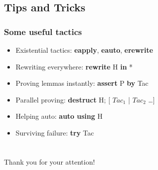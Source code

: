 \documentclass{beamer}
\begin{document}
\subsection{Tips and Tricks}

\begin{frame}
  \frametitle{Some useful tactics}
  \begin{itemize}
    \item Existential tactics: \textbf{eapply}, \textbf{eauto}, \textbf{erewrite}
    \item Rewriting everywhere: \textbf{rewrite} H \textbf{in} *
    \item Proving lemmas instantly: \textbf{assert} P \textbf{by} Tac
    \item Parallel proving: \textbf{destruct} H; [ $Tac_1$ | $Tac_2$ \ldots ]
    \item Helping auto: \textbf{auto using} H
    \item Surviving failure: \textbf{try} Tac
  \end{itemize}
\end{frame}
\section*{}

\begin{frame}[fragile]
  \begin{center}
    Thank you for your attention!
  \end{center}
\end{frame}
\end{document}
